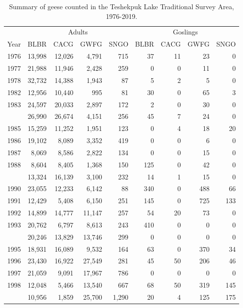 \documentclass[
]{article}
\begin{document}
\begin{table}

\caption{\label{tab:Kable_76_19}Summary of geese counted in the Teshekpuk Lake Traditional Survey Area, 1976-2019.}
\centering
\begin{tabular}[t]{lrrrrrrrr}
\toprule
\multicolumn{1}{c}{} & \multicolumn{4}{c}{Adults} & \multicolumn{4}{c}{Goslings} \\
\cmidrule(l{3pt}r{3pt}){2-5} \cmidrule(l{3pt}r{3pt}){6-9}
Year & BLBR & CACG & GWFG & SNGO & BLBR & CACG & GWFG & SNGO\\
\midrule
1976 & 13,998 & 12,026 & 4,791 & 715 & 37 & 11 & 23 & 0\\
1977 & 21,988 & 11,946 & 2,428 & 259 & 0 & 0 & 11 & 0\\
1978 & 32,732 & 14,388 & 1,943 & 87 & 5 & 2 & 5 & 0\\
1982 & 12,956 & 10,440 & 995 & 81 & 30 & 0 & 65 & 3\\
1983 & 24,597 & 20,033 & 2,897 & 172 & 2 & 0 & 30 & 0\\
\addlinespace
1984 & 26,990 & 26,674 & 4,151 & 256 & 45 & 7 & 24 & 0\\
1985 & 15,259 & 11,252 & 1,951 & 123 & 0 & 4 & 18 & 20\\
1986 & 19,102 & 8,089 & 3,352 & 419 & 0 & 0 & 6 & 0\\
1987 & 8,069 & 8,586 & 2,822 & 134 & 0 & 0 & 15 & 0\\
1988 & 8,604 & 8,405 & 1,368 & 150 & 125 & 0 & 42 & 0\\
\addlinespace
1989 & 13,324 & 16,139 & 3,100 & 232 & 14 & 1 & 15 & 0\\
1990 & 23,055 & 12,233 & 6,142 & 88 & 340 & 0 & 488 & 66\\
1991 & 12,429 & 5,408 & 6,150 & 251 & 145 & 0 & 725 & 133\\
1992 & 14,899 & 14,777 & 11,147 & 257 & 54 & 20 & 73 & 0\\
1993 & 20,762 & 6,797 & 8,613 & 243 & 410 & 0 & 0 & 0\\
\addlinespace
1994 & 20,246 & 13,829 & 13,746 & 299 & 0 & 0 & 0 & 0\\
1995 & 18,931 & 16,089 & 9,532 & 164 & 63 & 0 & 370 & 34\\
1996 & 23,430 & 16,922 & 27,549 & 281 & 45 & 50 & 206 & 46\\
1997 & 21,059 & 9,091 & 17,967 & 786 & 0 & 0 & 0 & 0\\
1998 & 12,048 & 5,466 & 13,540 & 667 & 68 & 50 & 319 & 145\\
\addlinespace
1999 & 10,956 & 1,859 & 25,700 & 1,290 & 20 & 4 & 125 & 175\\

\end{tabular}
\end{table}
\end{document}
